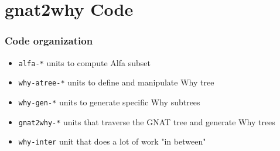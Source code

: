 \documentclass{beamer}
\newenvironment{specialframe}{%
  \begin{frame}[fragile,environment=specialframe]}{\end{frame}}
\begin{document}
\section{gnat2why Code}
\begin{specialframe}\frametitle{Code organization}
   \begin{itemize}
      \item \verb|alfa-*|       units to compute Alfa subset
      \item \verb|why-atree-*|  units to define and manipulate Why tree
      \item \verb|why-gen-*|    units to generate specific Why subtrees
      \item \verb|gnat2why-*|   units that traverse the GNAT tree and generate
         Why trees
      \item \verb|why-inter|    unit that does a lot of work "in between"
   \end{itemize}
\end{specialframe}
\end{document}
